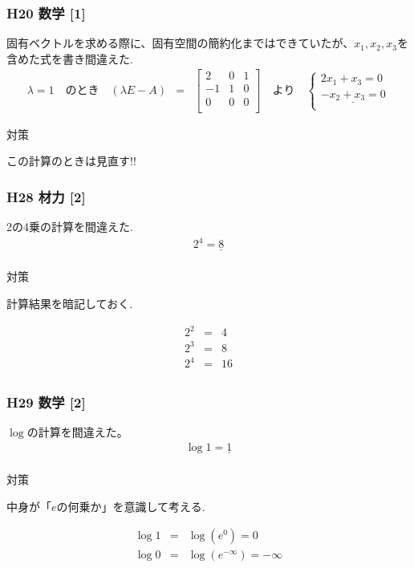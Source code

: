 \documentclass[a4paper]{jsarticle}
\begin{document}
\subsubsection{H20 数学 [1]}
固有ベクトルを求める際に、固有空間の簡約化まではできていたが、$x_1,x_2,x_3$を含めた式を書き間違えた.\\
\begin{eqnarray*}
    \lambda=1\quad のとき\quad
    \left(\lambda E - A\right)
    &=&
    \begin{bmatrix}
        2  & 0 & 1 \\
        -1 & 1 & 0 \\
        0  & 0 & 0 \\
    \end{bmatrix}
    \quad より\quad
    \begin{cases}
        {2x_1+x_3=0}             \\
        {\underline{-x_2+x_3=0}} \\
    \end{cases}
\end{eqnarray*}
\begin{itembox}[l]{対策}
    \begin{center}
        この計算のときは見直す!!
    \end{center}
\end{itembox}
\subsubsection{H28 材力 [2]}
2の4乗の計算を間違えた.
\begin{eqnarray*}
    2^4=\underline{8}\\
\end{eqnarray*}
\begin{itembox}[l]{対策}
    \begin{center}
        計算結果を暗記しておく.
    \end{center}
    \begin{eqnarray*}
        2^2&=&4\\
        2^3&=&8\\
        2^4&=&16\\
    \end{eqnarray*}
\end{itembox}
\subsubsection{H29 数学 [2]}
$\log$の計算を間違えた。
\begin{eqnarray*}
    \log 1 = \underline{1}\\
\end{eqnarray*}
\begin{itembox}[l]{対策}
    \begin{center}
        中身が「$e$の何乗か」を意識して考える.
    \end{center}
    \begin{eqnarray*}
        \log1&=&\log\left(e^0\right)=0\\
        \log0&=&\log\left(e^{-\infty}\right)=-\infty\\
    \end{eqnarray*}
\end{itembox}
\end{document}
